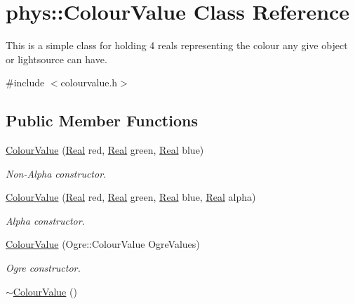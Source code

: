 \hypertarget{classphys_1_1ColourValue}{
\section{phys::ColourValue Class Reference}
\label{d3/db0/classphys_1_1ColourValue}
}


This is a simple class for holding 4 reals representing the colour any give object or lightsource can have.  




{\ttfamily \#include $<$colourvalue.h$>$}

\subsection*{Public Member Functions}
\begin{DoxyCompactItemize}
\item 
\hyperlink{classphys_1_1ColourValue_ac63b5fbf1b35b1855330ed5737fc16e0}{ColourValue} (\hyperlink{namespacephys_af7eb897198d265b8e868f45240230d5f}{Real} red, \hyperlink{namespacephys_af7eb897198d265b8e868f45240230d5f}{Real} green, \hyperlink{namespacephys_af7eb897198d265b8e868f45240230d5f}{Real} blue)
\begin{DoxyCompactList}\small\item\em Non-\/Alpha constructor. \item\end{DoxyCompactList}\item 
\hyperlink{classphys_1_1ColourValue_a28ee2493cd6a7bb8bc4104d223e3e709}{ColourValue} (\hyperlink{namespacephys_af7eb897198d265b8e868f45240230d5f}{Real} red, \hyperlink{namespacephys_af7eb897198d265b8e868f45240230d5f}{Real} green, \hyperlink{namespacephys_af7eb897198d265b8e868f45240230d5f}{Real} blue, \hyperlink{namespacephys_af7eb897198d265b8e868f45240230d5f}{Real} alpha)
\begin{DoxyCompactList}\small\item\em Alpha constructor. \item\end{DoxyCompactList}\item 
\hyperlink{classphys_1_1ColourValue_a8a004962cde5fd3063dd845be4256fa9}{ColourValue} (Ogre::ColourValue OgreValues)
\begin{DoxyCompactList}\small\item\em Ogre constructor. \item\end{DoxyCompactList}\item 
\hypertarget{classphys_1_1ColourValue_adc37cfdba61d80ad23765cea5c858751}{
\hyperlink{classphys_1_1ColourValue_adc37cfdba61d80ad23765cea5c858751}{$\sim$ColourValue} ()}
\label{d3/db0/classphys_1_1ColourValue_adc37cfdba61d80ad23765cea5c858751}


\end{DoxyCompactItemize}
